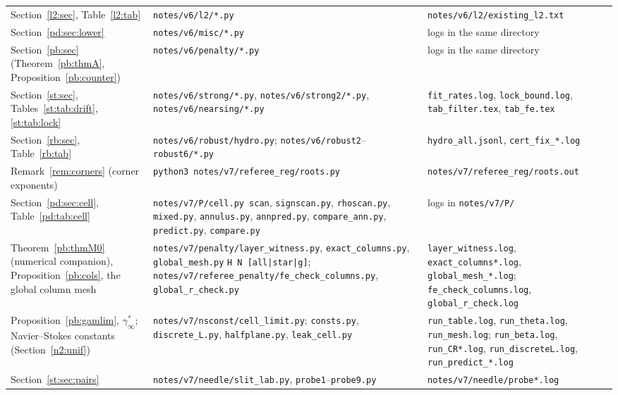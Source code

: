 {\begin{longtable}{>{\raggedright\arraybackslash}p{}>{\raggedright\arraybackslash}p{}>{\raggedright\arraybackslash}p{}}
Section~\ref{l2:sec}, Table~\ref{l2:tab} & \texttt{notes/v6/l2/*.py} & \texttt{notes/v6/l2/existing\_l2.txt}\\
Section~\ref{pd:sec:lower} & \texttt{notes/v6/misc/*.py} & logs in the same directory\\
Section~\ref{pb:sec} (Theorem~\ref{pb:thmA}, Proposition~\ref{pb:counter}) & \texttt{notes/v6/penalty/*.py} & logs in the same directory\\
Section~\ref{st:sec}, Tables~\ref{st:tab:drift}, \ref{st:tab:lock} & \texttt{notes/v6/strong/*.py}, \texttt{notes/v6/strong2/*.py}, \texttt{notes/v6/nearsing/*.py} & \texttt{fit\_rates.log}, \texttt{lock\_bound.log}, \texttt{tab\_filter.tex}, \texttt{tab\_fe.tex}\\
Section~\ref{rb:sec}, Table~\ref{rb:tab} & \texttt{notes/v6/robust/hydro.py}; \texttt{notes/v6/robust2}--\texttt{robust6/*.py} & \texttt{hydro\_all.jsonl}, \texttt{cert\_fix\_*.log}\\
Remark~\ref{rem:corners} (corner exponents) & \texttt{python3 notes/v7/referee\_reg/roots.py} & \texttt{notes/v7/referee\_reg/roots.out}\\
Section~\ref{pd:sec:cell}, Table~\ref{pd:tab:cell} & \texttt{notes/v7/P/cell.py scan}, \texttt{signscan.py}, \texttt{rhoscan.py}, \texttt{mixed.py}, \texttt{annulus.py}, \texttt{annpred.py}, \texttt{compare\_ann.py}, \texttt{predict.py}, \texttt{compare.py} & logs in \texttt{notes/v7/P/}\\
Theorem~\ref{pb:thmM0} (numerical companion), Proposition~\ref{pb:cols}, the global column mesh & \texttt{notes/v7/penalty/}\allowbreak\texttt{layer\_witness.py}, \texttt{exact\_columns.py}, \texttt{global\_mesh.py} \texttt{H N [all|star|g]}; \texttt{notes/v7/}\allowbreak\texttt{referee\_penalty/}\allowbreak\texttt{fe\_check\_columns.py}, \texttt{global\_r\_check.py} & \texttt{layer\_witness.log}, \texttt{exact\_columns*.log}, \texttt{global\_mesh\_*.log}; \texttt{fe\_check\_columns.log}, \texttt{global\_r\_check.log}\\
Proposition~\ref{pb:gamlim}, $\gamma^\ast_\infty$; Navier--Stokes constants (Section~\ref{n2:unif}) & \texttt{notes/v7/nsconst/cell\_limit.py}; \texttt{consts.py}, \texttt{discrete\_L.py}, \texttt{halfplane.py}, \texttt{leak\_cell.py} & \texttt{run\_table.log}, \texttt{run\_theta.log}, \texttt{run\_mesh.log}; \texttt{run\_beta.log}, \texttt{run\_CR*.log}, \texttt{run\_discreteL.log}, \texttt{run\_predict\_*.log}\\
Section~\ref{st:sec:pairs} & \texttt{notes/v7/needle/slit\_lab.py}, \texttt{probe1}--\texttt{probe9.py} & \texttt{notes/v7/needle/probe*.log}\\

\end{longtable}}
